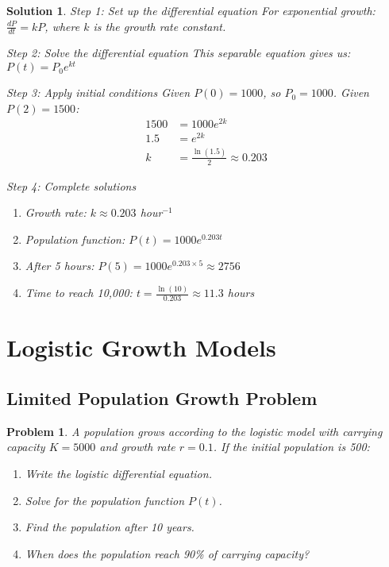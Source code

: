 \documentclass[12pt, letterpaper]{book}
\newcounter{problemcounter}[chapter]
\theoremstyle{problemstyle}
\newtheorem{problem}[problemcounter]{Problem}
\theoremstyle{solutionstyle}
\newtheorem*{solution}{Solution}
\begin{document}
\begin{solution}
\textit{Step 1: Set up the differential equation}
For exponential growth: $\frac{dP}{dt} = kP$, where $k$ is the growth rate constant.

\textit{Step 2: Solve the differential equation}
This separable equation gives us: $P(t) = P_0 e^{kt}$

\textit{Step 3: Apply initial conditions}
Given $P(0) = 1000$, so $P_0 = 1000$.
Given $P(2) = 1500$:
\begin{align*}
1500 &= 1000e^{2k} \\
1.5 &= e^{2k} \\
k &= \frac{\ln(1.5)}{2} \approx 0.203
\end{align*}

\textit{Step 4: Complete solutions}
\begin{enumerate}
    \item Growth rate: $k \approx 0.203$ hour$^{-1}$
    \item Population function: $P(t) = 1000e^{0.203t}$
    \item After 5 hours: $P(5) = 1000e^{0.203 \times 5} \approx 2756$
    \item Time to reach 10,000: $t = \frac{\ln(10)}{0.203} \approx 11.3$ hours
\end{enumerate}
\end{solution}

\section{Logistic Growth Models}

\subsection{Limited Population Growth Problem}

\begin{problem}
A population grows according to the logistic model with carrying capacity $K = 5000$ and growth rate $r = 0.1$. If the initial population is 500:
\begin{enumerate}
    \item Write the logistic differential equation.
    \item Solve for the population function $P(t)$.
    \item Find the population after 10 years.
    \item When does the population reach 90\% of carrying capacity?
\end{enumerate}
\end{problem}
\end{document}
